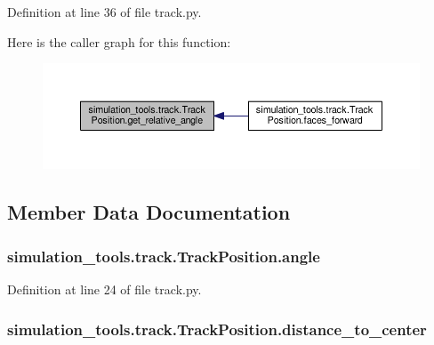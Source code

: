 Definition at line 36 of file track.\+py.



Here is the caller graph for this function\+:
\nopagebreak
\begin{figure}[H]
\begin{center}
\leavevmode
\includegraphics[width=350pt]{classsimulation__tools_1_1track_1_1_track_position_ae4cf3681d7edde291e3c566cfb21397a_icgraph}
\end{center}
\end{figure}




\subsection{Member Data Documentation}
\subsubsection[{\texorpdfstring{angle}{angle}}]{\setlength{\rightskip}{0pt plus 5cm}simulation\+\_\+tools.\+track.\+Track\+Position.\+angle}\hypertarget{classsimulation__tools_1_1track_1_1_track_position_a4809c7245ab044b2b3ca96fbdc80fe72}{}\label{classsimulation__tools_1_1track_1_1_track_position_a4809c7245ab044b2b3ca96fbdc80fe72}


Definition at line 24 of file track.\+py.

\subsubsection[{\texorpdfstring{distance\+\_\+to\+\_\+center}{distance_to_center}}]{\setlength{\rightskip}{0pt plus 5cm}simulation\+\_\+tools.\+track.\+Track\+Position.\+distance\+\_\+to\+\_\+center}\hypertarget{classsimulation__tools_1_1track_1_1_track_position_a1d45644ad2113e0c7a8e546f52015d46}{}\label{classsimulation__tools_1_1track_1_1_track_position_a1d45644ad2113e0c7a8e546f52015d46}


